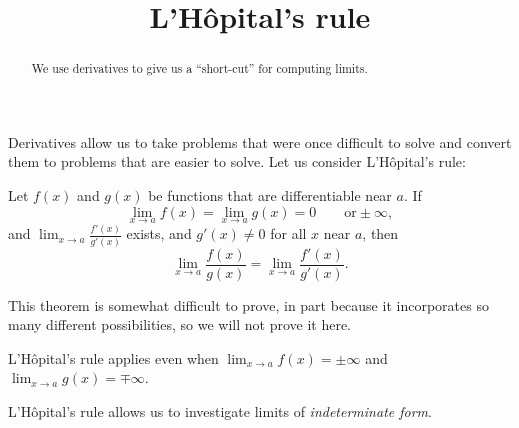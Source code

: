 \documentclass{ximera}
\title[Dig-In:]{L'H\^{o}pital's rule}
\begin{document}
\begin{abstract}
  We use derivatives to give us a ``short-cut'' for computing limits.
\end{abstract}
\maketitle

Derivatives allow us to take problems that were once difficult to
solve and convert them to problems that are easier to solve. Let us
consider L'H\^{o}pital's rule:

\begin{theorem} 
Let $f(x)$ and $g(x)$ be functions that are differentiable near $a$.  If
\[
\lim_{x \to a} f(x) = \lim_{x \to a}g(x) = 0 \qquad \text{or} \pm \infty,
\]
and $\lim_{x \to a} \frac{f'(x)}{g'(x)}$ exists, and $g'(x) \neq 0$
for all $x$ near $a$, then 
\[
\lim_{x \to a} \frac{f(x)}{g(x)} = \lim_{x \to a} \frac{f'(x)}{g'(x)}.
\]
\end{theorem}

This theorem is somewhat difficult to prove, in part because it
incorporates so many different possibilities, so we will not prove it
here. 
\begin{remark}
  L'H\^{o}pital's rule applies even when $\lim_{x\to a}f(x) = \pm \infty$
  and $\lim_{x\to a}g(x) = \mp \infty$.
\end{remark}


L'H\^{o}pital's rule allows us to investigate limits of
\textit{indeterminate form}.
\end{document}
